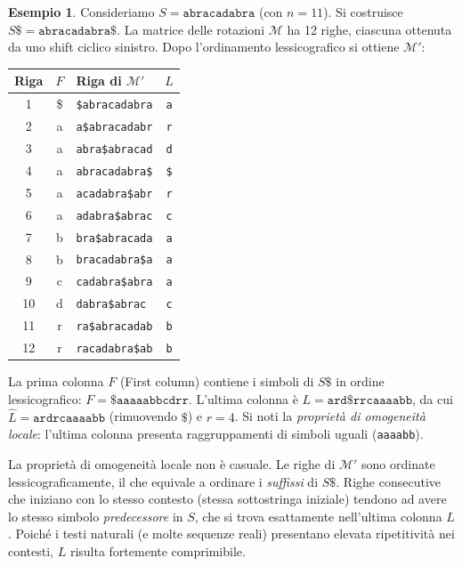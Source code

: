 \documentclass[12pt, a4paper, oneside]{book}
\theoremstyle{plain}
\theoremstyle{definition}
\newtheorem{esempio}[teorema]{Esempio}
\theoremstyle{remark}
\begin{document}
\begin{esempio}
Consideriamo $S = \texttt{abracadabra}$ (con $n = 11$). Si costruisce $S\$ = \texttt{abracadabra\$}$. La matrice delle rotazioni $\mathcal{M}$ ha 12 righe, ciascuna ottenuta da uno shift ciclico sinistro. Dopo l'ordinamento lessicografico si ottiene $\mathcal{M}'$:

\begin{center}
\begin{tabular}{c|c|l|c}
\textbf{Riga} & $F$ & \textbf{Riga di $\mathcal{M}'$} & $L$ \\
\hline
1  & \$ & \texttt{\$abracadabra} & \texttt{a} \\
2  & a & \texttt{a\$abracadabr} & \texttt{r} \\
3  & a & \texttt{abra\$abracad} & \texttt{d} \\
4  & a & \texttt{abracadabra\$} & \texttt{\$} \\
5  & a & \texttt{acadabra\$abr} & \texttt{r} \\
6  & a & \texttt{adabra\$abrac} & \texttt{c} \\
7  & b & \texttt{bra\$abracada} & \texttt{a} \\
8  & b & \texttt{bracadabra\$a} & \texttt{a} \\
9  & c & \texttt{cadabra\$abra} & \texttt{a} \\
10 & d & \texttt{dabra\$abrac}\ & \texttt{c} \\
11 & r & \texttt{ra\$abracadab} & \texttt{b} \\
12 & r & \texttt{racadabra\$ab} & \texttt{b} \\
\end{tabular}
\end{center}

La prima colonna $F$ (First column) contiene i simboli di $S\$$ in ordine lessicografico: $F = \texttt{\$aaaaabbcdrr}$. L'ultima colonna è $L = \texttt{ard\$rrcaaaabb}$, da cui $\widehat{L} = \texttt{ardrcaaaabb}$ (rimuovendo $\$$) e $r = 4$. Si noti la \emph{proprietà di omogeneità locale}: l'ultima colonna presenta raggruppamenti di simboli uguali (\texttt{aaaabb}).
\end{esempio}

La proprietà di omogeneità locale non è casuale. Le righe di $\mathcal{M}'$ sono ordinate lessicograficamente, il che equivale a ordinare i \emph{suffissi} di $S\$$. Righe consecutive che iniziano con lo stesso contesto (stessa sottostringa iniziale) tendono ad avere lo stesso simbolo \emph{predecessore} in $S$, che si trova esattamente nell'ultima colonna $L$. Poiché i testi naturali (e molte sequenze reali) presentano elevata ripetitività nei contesti, $L$ risulta fortemente comprimibile.
\end{document}
